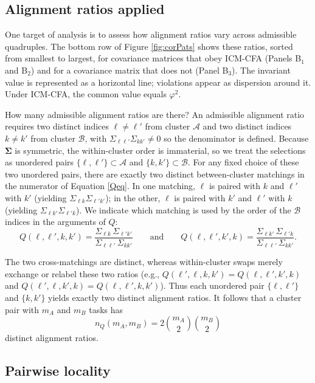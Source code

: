 \documentclass[
  american,
  man,floatsintext]{apa7}
\begin{document}
\subsection{Alignment ratios applied}\label{alignment-ratios-applied}

One target of analysis is to assess how alignment ratios vary across admissible quadruples. The bottom row of Figure \ref{fig:corPats} shows these ratios, sorted from smallest to largest, for covariance matrices that obey ICM-CFA (Panels B\(_1\) and B\(_2\)) and for a covariance matrix that does not (Panel B\(_3\)). The invariant value is represented as a horizontal line; violations appear as dispersion around it. Under ICM-CFA, the common value equals \(\varphi^2\).

How many admissible alignment ratios are there? An admissible alignment ratio requires two distinct indices \(\ell\neq\ell'\) from cluster \(\mathcal{A}\) and two distinct indices \(k\neq k'\) from cluster \(\mathcal{B}\), with \(\Sigma_{\ell\ell'}\Sigma_{kk'}\neq 0\) so the denominator is defined. Because \(\pmb{\Sigma}\) is symmetric, the within-cluster order is immaterial, so we treat the selections as unordered pairs \(\{\ell,\ell'\}\subset\mathcal{A}\) and \(\{k,k'\}\subset\mathcal{B}\). For any fixed choice of these two unordered pairs, there are exactly two distinct between-cluster matchings in the numerator of Equation \eqref{Qeq}. In one matching, \(\ell\) is paired with \(k\) and \(\ell'\) with \(k'\) (yielding \(\Sigma_{\ell k}\Sigma_{\ell'k'}\)); in the other, \(\ell\) is paired with \(k'\) and \(\ell'\) with \(k\) (yielding \(\Sigma_{\ell k'}\Sigma_{\ell'k}\)). We indicate which matching is used by the order of the \(\mathcal{B}\) indices in the arguments of \(Q\):
\[
Q(\ell,\ell',k,k')=\frac{\Sigma_{\ell k}\,\Sigma_{\ell' k'}}
{\Sigma_{\ell\ell'}\,\Sigma_{kk'}}
\qquad\text{and}\qquad
Q(\ell,\ell',k',k)=\frac{\Sigma_{\ell k'}\,\Sigma_{\ell' k}}
{\Sigma_{\ell\ell'}\,\Sigma_{kk'}}.
\]

The two cross-matchings are distinct, whereas within-cluster swaps merely exchange or relabel these two ratios (e.g., \(Q(\ell',\ell,k,k')=Q(\ell,\ell',k',k)\) and \(Q(\ell',\ell,k',k)=Q(\ell,\ell',k,k')\)). Thus each unordered pair \(\{\ell,\ell'\}\) and \(\{k,k'\}\) yields exactly two distinct alignment ratios. It follows that a cluster pair with \(m_A\) and \(m_B\) tasks has
\[
n_Q(m_A,m_B)=2\binom{m_A}{2}\binom{m_B}{2}
\]
distinct alignment ratios.

\subsection{Pairwise locality}\label{pairwise-locality}
\end{document}
